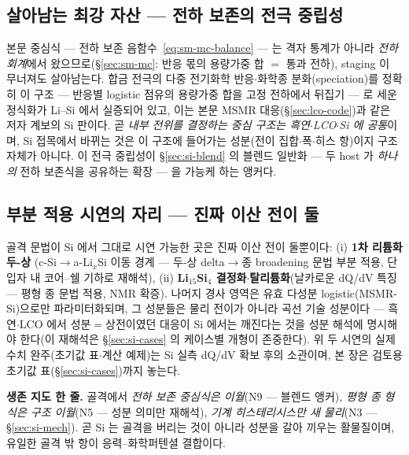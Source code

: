 \subsection{살아남는 최강 자산 --- 전하 보존의 전극 중립성}\label{ssec:si-neutral}
본문 중심식 --- 전하 보존 음함수~\eqref{eq:sm-mc-balance} --- 는 격자 통계가 아니라 \emph{전하
회계}에서 왔으므로(\S\ref{sec:sm-mc}: 반응 몫의 용량가중 합 $=$ 통과 전하), staging 이 무너져도
살아남는다. 합금 전극의 다중 전기화학 반응$\cdot$화학종 분화(speciation)를 정확히 이 구조 --- 반응별
logistic 점유의 용량가중 합을 고정 전하에서 뒤집기 --- 로 세운 정식화가 Li--Si 에서
실증되어 있고\cite{verbrugge_lisi2016}, 이는 본문 MSMR 대응(\S\ref{sec:lco-code})과 같은 저자 계보의 Si
판이다. 곧 \emph{내부 전위를 결정하는 중심 구조는 흑연$\cdot$LCO$\cdot$Si 에 공통}이며, Si 접목에서 바뀌는
것은 이 구조에 들어가는 성분(전이 집합$\cdot$폭$\cdot$히스 항)이지 구조 자체가 아니다. 이 전극 중립성이
\S\ref{sec:si-blend} 의 블렌드 일반화 --- 두 host 가 \emph{하나의} 전하 보존식을 공유하는 확장 --- 을
가능케 하는 앵커다.

\subsection{부분 적용 시연의 자리 --- 진짜 이산 전이 둘}\label{ssec:si-demo}
골격 문법이 Si 에서 그대로 시연 가능한 곳은 진짜 이산 전이 둘뿐이다: (i) \textbf{1차 리튬화 두-상}
(c-Si$\to$a-Li$_x$Si 이동 경계 --- 두-상 delta$\to$종 broadening 문법 부분 적용, 단 입자 내 코어--쉘
기하로 재해석\cite{mcdowell_coreshell2013}), (ii) \textbf{Li$_{15}$Si$_4$ 결정화$\cdot$탈리튬화}(날카로운
dQ/dV 특징 --- 평형 종 문법 적용, NMR 확증\cite{ogata_nmr2014}). 나머지 경사 영역은 유효 다성분
logistic(MSMR-Si)으로만 파라미터화되며, 그 성분들은 물리 전이가 아니라 곡선 기술 성분이다 ---
흑연$\cdot$LCO 에서 성분$=$상전이였던 대응이 Si 에서는 깨진다는 것을 성분 해석에 명시해야 한다(이 재해석은
\S\ref{sec:si-cases} 의 케이스별 개형이 존중한다). 위 두 시연의 실제 수치 완주(초기값 표$\cdot$계산
예제)는 Si 실측 dQ/dV 확보 후의 소관이며, 본 장은 검토용 초기값 표(\S\ref{sec:si-cases})까지 놓는다.

\begin{keybox}
\textbf{생존 지도 한 줄.} 골격에서 \emph{전하 보존 중심식은 이월}(N9 --- 블렌드 앵커), \emph{평형 종
형식은 구조 이월}(N5 --- 성분 의미만 재해석), \emph{기계 히스테리시스만 새 물리}(N3 --- \S\ref{sec:si-mech}).
곧 Si 는 골격을 버리는 것이 아니라 성분을 갈아 끼우는 활물질이며, 유일한 골격 밖 항이 응력--화학퍼텐셜
결합이다.
\end{keybox}


